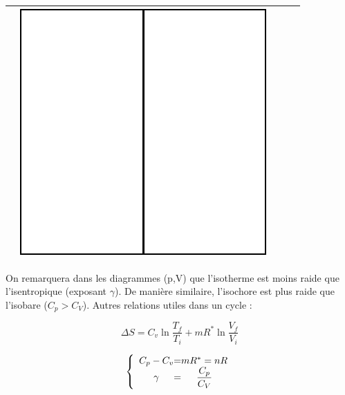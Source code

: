 \begin{table}[!h]
\begin{center}
\begin{tabular}{|r|c|c|c|c|}
     & \includegraphics[scale=0.25]{isentropiquets.png}\\



  \hline

\end{tabular}
\end{center}
\end{table}

On remarquera dans les diagrammes (p,V) que l'isotherme est moins raide que l'isentropique (exposant $\gamma$). De manière similaire, l'isochore est plus raide que l'isobare ($C_p > C_V$).
Autres relations utiles dans un cycle :

$$\displaystyle\Delta S = C_v \ln \frac{T_f}{T_i} + m R^* \ln\frac{V_f}{V_i}$$

\[
\left \{
\begin{array}{c @{ = } c}
    C_p - C_v & mR^*=nR \\
    \gamma & \displaystyle\frac{C_p}{C_V} \\
\end{array}
\right.
\]
%
